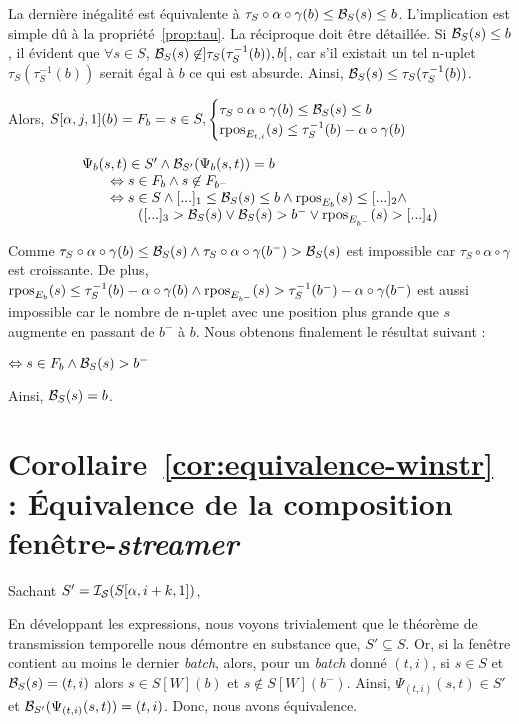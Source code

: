 La dernière inégalité est équivalente à $\tau_S\circ\alpha\circ\gamma(b) \leq \mathcal{B}_S(s) \leq  b$. L'implication est simple dû à la propriété~\ref{prop:tau}. La réciproque doit être détaillée. Si $\mathcal{B}_S(s) \leq b$, il évident que $\forall s\in S$, $\mathcal{B}_S(s)\not\in]\tau_S(\tau_S^{-1}(b)), b[$, car s'il existait un tel n-uplet $\tau_S(\tau_S^{-1}(b))$ serait égal à $b$ ce qui est absurde. Ainsi, $\mathcal{B}_S(s) \leq \tau_S(\tau_S^{-1}(b))$.

Alors, $S[\alpha,j,1](b) = F_{b}=s\in S, \begin{cases}\tau_S\circ\alpha\circ\gamma(b) \leq \mathcal{B}_S(s) \leq b \\\mathop{\mathrm{rpos}}_{E_{t,i}}(s) \leq \tau_S^{-1}(b) - \alpha\circ\gamma(b) \end{cases}$

$$\begin{array}{l}\Psi_{b}(s,t)\in S' \wedge \mathcal{B}_{S'}(\Psi_{b}(s,t)) = b\\ \qquad
 \Leftrightarrow  s\in F_{b} \wedge s\not\in F_{b^-} \\ \qquad
 \Leftrightarrow  s\in S \wedge [...]_1 \leq \mathcal{B}_S(s) \leq b \wedge \mathop{\mathrm{rpos}}_{E_{b}}(s) \leq [...]_2\wedge \\ \qquad
 \qquad  ([...]_3 > \mathcal{B}_S(s) \vee \mathcal{B}_S(s) > b^- \vee \mathop{\mathrm{rpos}}_{E_{b^-}}(s) > [...]_4)\end{array}$$

Comme $\tau_S\circ\alpha\circ\gamma(b) \leq \mathcal{B}_S(s) \wedge \tau_S\circ\alpha\circ\gamma(b^-) > \mathcal{B}_S(s)$ est impossible car $\tau_S\circ\alpha\circ\gamma$ est croissante. De plus, $\mathop{\mathrm{rpos}}_{E_{b}}(s) \leq \tau_S^{-1}(b) - \alpha\circ\gamma(b) \wedge \mathop{\mathrm{rpos}}_{E_{b^-}}(s) > \tau_S^{-1}(b^-) - \alpha\circ\gamma(b^-)$ est aussi impossible car le nombre de n-uplet avec une position plus grande que $s$ augmente en passant de $b^-$ à $b$. Nous obtenons finalement le résultat suivant :

$\Leftrightarrow s\in F_{b} \wedge \mathcal{B}_S(s) > b^-$

Ainsi, $\mathcal{B}_S(s) = b$.
\findemo

\section{Corollaire~\ref{cor:equivalence-winstr} : Équivalence de la composition fenêtre-\textit{streamer}}
Sachant $S' = \mathcal{I_S}(S[\alpha,i+k,1])$,

En développant les expressions, nous voyons trivialement que le théorème de transmission temporelle nous démontre en substance que, $S' \subseteq S$. Or, si la fenêtre contient au moins le dernier \textit{batch}, alors, pour un \textit{batch} donné $(t,i)$, si $s\in S$ et $\mathcal{B}_S(s)=(t,i)$ alors $s\in S[W](b)$ et $s\not\in S[W](b^-)$. Ainsi, $\Psi_{(t,i)}(s,t) \in S'$ et $\mathcal{B}_{S'}(\Psi_{(t,i)}(s,t)) = (t,i)$. Donc, nous avons équivalence.

